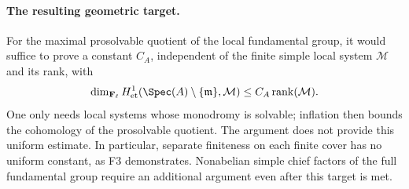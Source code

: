 \paragraph{The resulting geometric target.}
For the maximal prosolvable quotient of the local fundamental group,
it would suffice to prove a constant $C_A$, independent of the
finite simple local system $\mathcal M$ and its rank, with
\[
 \dim_{\mathbf F_\ell}H^1_{\mathrm{et}}
       (\Spec(A)\setminus\{\mathfrak m\},\mathcal M)
 \leq C_A\operatorname{rank}(\mathcal M).
\]
One only needs local systems whose monodromy is solvable; inflation
then bounds the cohomology of the prosolvable quotient. The argument
does not provide this uniform estimate. In particular, separate
finiteness on each finite cover has no uniform constant, as F3
demonstrates. Nonabelian simple chief factors of the full fundamental
group require an additional argument even after this target is met.
